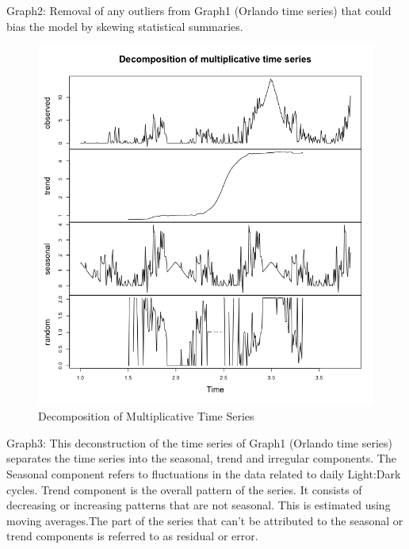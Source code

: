 \documentclass[]{article}
\begin{document}
Graph2: Removal of any outliers from Graph1 (Orlando time series) that
could bias the model by skewing statistical summaries.

\begin{figure}
\centering
\includegraphics{DECOMPfp.png}
\caption{Decomposition of Multiplicative Time Series}
\end{figure}

Graph3: This deconstruction of the time series of Graph1 (Orlando time
series) separates the time series into the seasonal, trend and irregular
components. The Seasonal component refers to fluctuations in the data
related to daily Light:Dark cycles. Trend component is the overall
pattern of the series. It consists of decreasing or increasing patterns
that are not seasonal. This is estimated using moving averages.The part
of the series that can't be attributed to the seasonal or trend
components is referred to as residual or error.
\end{document}
